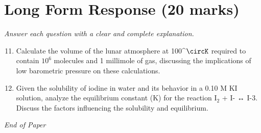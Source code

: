 \documentclass[12pt]{article}
\begin{document}
\section*{Long Form Response (20 marks)}
\textit{Answer each question with a clear and complete explanation.}
\begin{enumerate}[label=\arabic*.]
\setcounter{enumi}{10}
\item Calculate the volume of the lunar atmosphere at 100^\ensuremath{\circK} required to contain $10^6$ molecules and 1 millimole of gas, discussing the implications of low barometric pressure on these calculations.
\item Given the solubility of iodine in water and its behavior in a 0.10 M KI solution, analyze the equilibrium constant (K) for the reaction I$_{2}$ + I- ↔ I-3. Discuss the factors influencing the solubility and equilibrium.
\end{enumerate}

\vfill
\noindent\textit{End of Paper}
\end{document}
